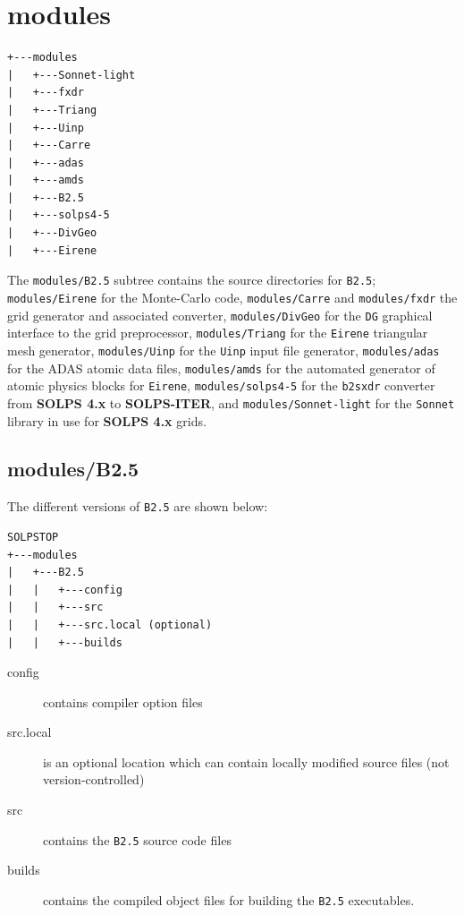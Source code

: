 \documentclass[a4paper,10pt]{report}
\newcommand\SOLPSfour{{\bf SOLPS 4.x} }
\newcommand\SOLPSITERns{{\bf SOLPS-ITER}}
\begin{document}
\newpage
\section{modules}

\begin{verbatim}
+---modules
|   +---Sonnet-light
|   +---fxdr
|   +---Triang
|   +---Uinp
|   +---Carre
|   +---adas
|   +---amds
|   +---B2.5
|   +---solps4-5
|   +---DivGeo
|   +---Eirene
\end{verbatim}

The {\tt modules/B2.5} subtree contains the source directories
for {\tt B2.5}; {\tt modules/Eirene} for the Monte-Carlo code, {\tt modules/Carre} and
{\tt modules/fxdr}
the grid generator and associated converter,
{\tt modules/DivGeo} for the {\tt DG} graphical interface
to the grid preprocessor, {\tt modules/Triang} for the {\tt Eirene} triangular mesh generator,
{\tt modules/Uinp} for the {\tt Uinp} input file generator,
{\tt modules/adas} for the ADAS atomic data files,
{\tt modules/amds} for the automated generator of atomic physics blocks for {\tt Eirene},
{\tt modules/solps4-5} for the {\tt b2sxdr} converter from
\SOLPSfour to \SOLPSITERns, and {\tt modules/Sonnet-light} for the {\tt Sonnet} library in use
for \SOLPSfour grids.

\newpage\subsection{modules/B2.5}
\label{sec:b2}

The different versions of {\tt B2.5} are shown below:


\begin{verbatim}
SOLPSTOP
+---modules
|   +---B2.5
|   |   +---config
|   |   +---src
|   |   +---src.local (optional)
|   |   +---builds
\end{verbatim}

\begin{description}
\item[config]  contains compiler option files
\item[src.local] \label{src.local} is an optional location which can contain locally modified source files (not version-controlled)
\item[src] \label{b2.5_src}
  contains the {\tt B2.5} source code files
\item[builds] contains the compiled object files for building the {\tt B2.5} executables.
\end{description}
\end{document}
